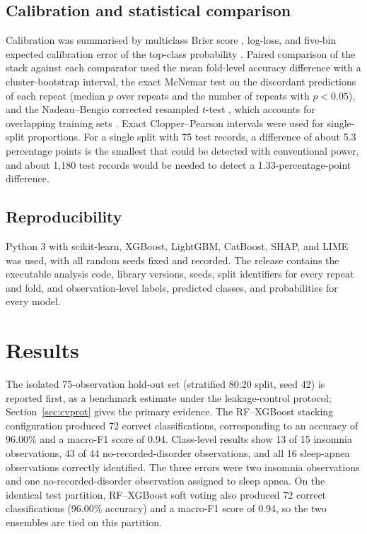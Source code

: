 \documentclass[a4paper,fleqn]{cas-dc}
\begin{document}
\subsection{Calibration and statistical comparison}
Calibration was summarised by multiclass Brier score \cite{brier1950}, log-loss, and five-bin expected calibration error of the top-class probability \cite{guo2017}. Paired comparison of the stack against each comparator used the mean fold-level accuracy difference with a cluster-bootstrap interval, the exact McNemar test on the discordant predictions of each repeat (median $p$ over repeats and the number of repeats with $p<0.05$), and the Nadeau--Bengio corrected resampled $t$-test \cite{nadeau2003}, which accounts for overlapping training sets \cite{dietterich1998}. Exact Clopper--Pearson intervals \cite{clopper1934} were used for single-split proportions. For a single split with 75 test records, a difference of about 5.3 percentage points is the smallest that could be detected with conventional power, and about 1,180 test records would be needed to detect a 1.33-percentage-point difference.

\subsection{Reproducibility}
\label{sec:repro}
Python 3 with scikit-learn, XGBoost, LightGBM, CatBoost, SHAP, and LIME was used, with all random seeds fixed and recorded. The release contains the executable analysis code, library versions, seeds, split identifiers for every repeat and fold, and observation-level labels, predicted classes, and probabilities for every model.

\FloatBarrier
\section{Results}
\label{sec:results}

The isolated 75-observation hold-out set (stratified 80:20 split, seed 42) is reported first, as a benchmark estimate under the leakage-control protocol; Section~\ref{sec:cvprot} gives the primary evidence. The RF--XGBoost stacking configuration produced 72 correct classifications, corresponding to an accuracy of 96.00\% and a macro-F1 score of 0.94. Class-level results show 13 of 15 insomnia observations, 43 of 44 no-recorded-disorder observations, and all 16 sleep-apnea observations correctly identified. The three errors were two insomnia observations and one no-recorded-disorder observation assigned to sleep apnea. On the identical test partition, RF--XGBoost soft voting also produced 72 correct classifications (96.00\% accuracy) and a macro-F1 score of 0.94, so the two ensembles are tied on this partition.
\end{document}
